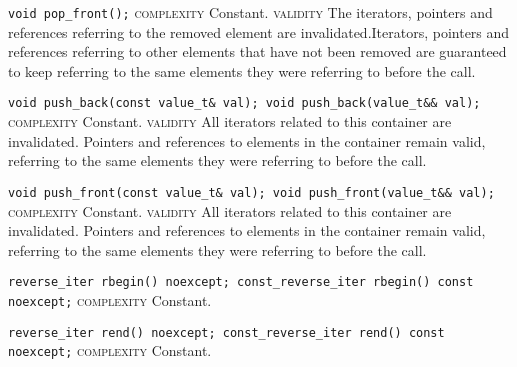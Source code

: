 \noindent{}\hspace*{0.25em}\lstinline[basicstyle=\ttfamily\color{cgreen}]{void pop_front();} \textsc{complexity} Constant. \textsc{validity} The iterators, pointers and references referring to the removed element are invalidated.Iterators, pointers and references referring to other elements that have not been removed are guaranteed to keep referring to the same elements they were referring to before the call.\\\vspace{-0.6em}

\noindent{}\hspace*{0.25em}\lstinline[basicstyle=\ttfamily\color{cgreen}]{void push_back(const value_t& val); void push_back(value_t&& val);} \textsc{complexity} Constant. \textsc{validity} All iterators related to this container are invalidated. Pointers and references to elements in the container remain valid, referring to the same elements they were referring to before the call.\\\vspace{-0.6em}

\noindent{}\hspace*{0.25em}\lstinline[basicstyle=\ttfamily\color{cgreen}]{void push_front(const value_t& val); void push_front(value_t&& val);} \textsc{complexity} Constant. \textsc{validity} All iterators related to this container are invalidated. Pointers and references to elements in the container remain valid, referring to the same elements they were referring to before the call.\\\vspace{-0.6em}

\noindent{}\hspace*{0.25em}\lstinline[basicstyle=\ttfamily\color{cgreen}]{reverse_iter rbegin() noexcept; const_reverse_iter rbegin() const noexcept;} \textsc{complexity} Constant.\\\vspace{-0.6em}

\noindent{}\hspace*{0.25em}\lstinline[basicstyle=\ttfamily\color{cgreen}]{reverse_iter rend() noexcept; const_reverse_iter rend() const noexcept;} \textsc{complexity} Constant.\\\vspace{-0.6em}

